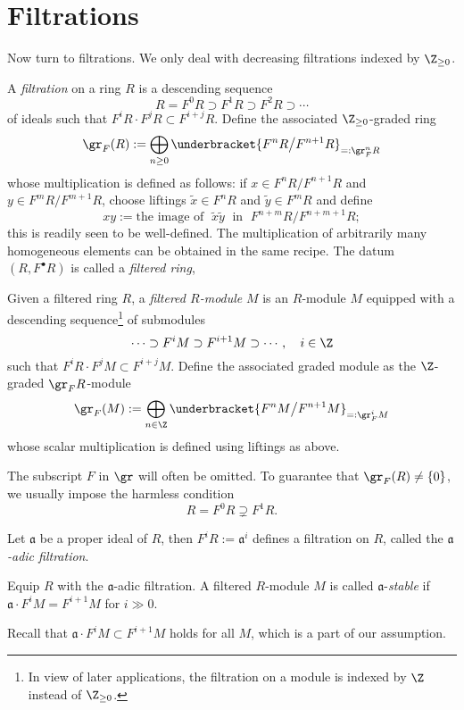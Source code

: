 \section{Filtrations}
Now turn to filtrations. We only deal with decreasing filtrations indexed by $\Z_{\geq 0}$.
\begin{definition}
	A \emph{filtration} on a ring $R$ is a descending sequence
	\[ R = F^0 R \supset F^1 R \supset F^2 R \supset \cdots \]
	of ideals such that $F^i R \cdot F^j R \subset F^{i+j} R$. Define the associated $\Z_{\geq 0}$-graded ring
	\[ \gr_F(R) := \bigoplus_{n \geq 0} \underbracket{F^n R \big/ F^{n+1} R}_{=: \gr_F^n R} \]
	whose multiplication is defined as follows: if $x \in F^n R / F^{n+1} R$ and $y \in F^m R/F^{m+1} R$, choose liftings $\tilde{x} \in F^n R$ and $\tilde{y} \in F^m R$ and define
	\[ xy := \text{the image of }\; \tilde{x}\tilde{y}\; \text{ in }\; F^{n+m} R / F^{n+m+1} R; \]
	this is readily seen to be well-defined. The multiplication of arbitrarily many homogeneous elements can be obtained in the same recipe. The datum $(R, F^\bullet R)$ is called a \emph{filtered ring},

	Given a filtered ring $R$, a \emph{filtered $R$-module} $M$ is an $R$-module $M$ equipped with a descending sequence\footnote{In view of later applications, the filtration on a module is indexed by $\Z$ instead of $\Z_{\geq 0}$.} of submodules
	\[ \cdots \supset F^i M \supset F^{i+1} M \supset \cdots, \quad i \in \Z \]
	such that $F^i R \cdot F^j M \subset F^{i+j} M$. Define the associated graded module as the $\Z$-graded $\gr_F R$-module
	\[ \gr_F(M) := \bigoplus_{n \in \Z} \underbracket{F^n M \big/ F^{n+1} M}_{=: \gr_F^i M} \]
	whose scalar multiplication is defined using liftings as above.
\end{definition}

The subscript $F$ in $\gr$ will often be omitted. To guarantee that $\gr_F(R) \neq \{0\}$, we usually impose the harmless condition
\[ R = F^0 R \supsetneq F^1 R. \]

\begin{example}
	Let $\mathfrak{a}$ be a proper ideal of $R$, then $F^i R := \mathfrak{a}^i$ defines a filtration on $R$, called the \emph{$\mathfrak{a}$-adic filtration}.
\end{example}

\begin{definition}\label{def:a-stable}
	Equip $R$ with the $\mathfrak{a}$-adic filtration. A filtered $R$-module $M$ is called $\mathfrak{a}$-\emph{stable} if $\mathfrak{a} \cdot F^i M = F^{i+1} M$ for $i \gg 0$.
\end{definition}
Recall that $\mathfrak{a} \cdot F^i M \subset F^{i+1} M$ holds for all $M$, which is a part of our assumption.

